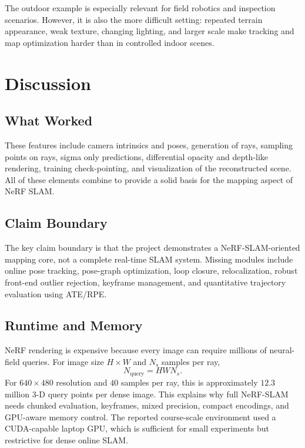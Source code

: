 \documentclass[conference]{IEEEtran}
\begin{document}
The outdoor example is especially relevant for field robotics and inspection scenarios. However, it is also the more difficult setting: repeated terrain appearance, weak texture, changing lighting, and larger scale make tracking and map optimization harder than in controlled indoor scenes.

\section{Discussion}
\subsection{What Worked}
These features include camera intrinsics and poses, generation of rays, sampling points on rays, sigma only predictions, differential opacity and depth-like rendering, training check-pointing, and visualization of the reconstructed scene. All of these elements combine to provide a solid basis for the mapping aspect of NeRF SLAM.

\subsection{Claim Boundary}
The key claim boundary is that the project demonstrates a NeRF-SLAM-oriented mapping core, not a complete real-time SLAM system. Missing modules include online pose tracking, pose-graph optimization, loop closure, relocalization, robust front-end outlier rejection, keyframe management, and quantitative trajectory evaluation using ATE/RPE.

\subsection{Runtime and Memory}
NeRF rendering is expensive because every image can require millions of neural-field queries. For image size $H\times W$ and $N_s$ samples per ray,
\begin{equation}
N_{\mathrm{query}}=HWN_s.
\end{equation}
For $640\times480$ resolution and $40$ samples per ray, this is approximately $12.3$ million 3-D query points per dense image. This explains why full NeRF-SLAM needs chunked evaluation, keyframes, mixed precision, compact encodings, and GPU-aware memory control. The reported course-scale environment used a CUDA-capable laptop GPU, which is sufficient for small experiments but restrictive for dense online SLAM.
\end{document}
